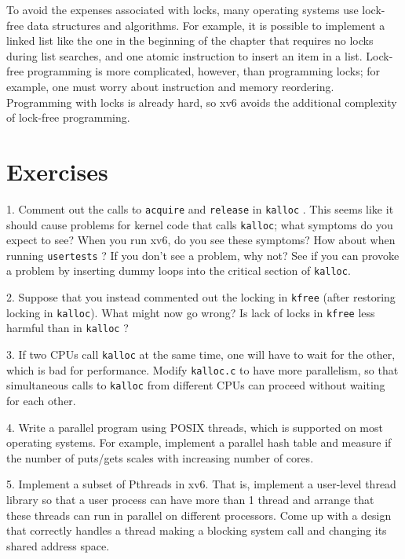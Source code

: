 To avoid the expenses associated with locks, many operating systems use
lock-free data structures and algorithms.  For example, it is possible to
implement a linked list like the one in the beginning of the chapter that
requires no locks during list searches, and one atomic instruction to insert an
item in a list.  Lock-free programming is more complicated, however, than
programming locks; for example, one must worry about instruction and memory
reordering.  Programming with locks is already hard, so xv6 avoids the
additional complexity of lock-free programming.
\section{Exercises}

1. Comment out the calls to
\lstinline{acquire}
and
\lstinline{release}
in
\lstinline{kalloc}
.
This seems like it should cause problems for
kernel code that calls
\lstinline{kalloc};
what symptoms do you expect to see?
When you run xv6, do you see these symptoms?
How about when running
\lstinline{usertests} ?
If you don't see a problem, why not?
See if you can provoke a problem by inserting
dummy loops into the critical section of
\lstinline{kalloc}.

2. Suppose that you instead commented out the
locking in
\lstinline{kfree} 
(after restoring locking in
\lstinline{kalloc}).
What might now go wrong? Is lack of locks in
\lstinline{kfree}
less harmful than in
\lstinline{kalloc} ?

3. If two CPUs call
\lstinline{kalloc}
at the same time, one will have to wait for the other,
which is bad for performance.
Modify 
\lstinline{kalloc.c}
to have more parallelism, so that simultaneous
calls to
\lstinline{kalloc}
from different CPUs can proceed without waiting for each other.

4. Write a parallel program using POSIX threads, which is supported on most
operating systems. For example, implement a parallel hash table and measure if
the number of puts/gets scales with increasing number of cores.

5. Implement a subset of Pthreads in xv6.  That is, implement a user-level
thread library so that a user process can have more than 1 thread and arrange
that these threads can run in parallel on different processors.  Come up with a
design that correctly handles a thread making a blocking system call and
changing its shared address space.
